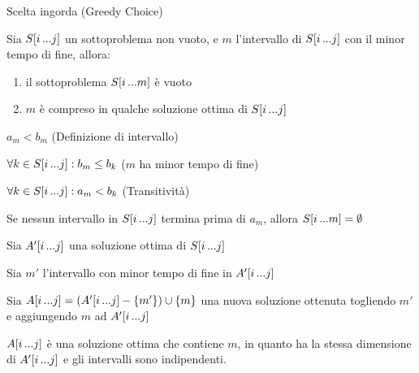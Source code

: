 \begin{frame}{Scelta ingorda (Greedy Choice)}

\vspace{-9pt}
\begin{myboxtitle}[Teorema]
Sia $S[i \mydots j]$ un sottoproblema non vuoto, e $m$ l'intervallo di $S[i \mydots j]$ con il \alert{minor tempo di fine}, allora:
\begin{enumerate}
\item il sottoproblema $S[i \mydots m]$ è vuoto
\item $m$ è compreso in qualche soluzione ottima di $S[i \mydots j]$
\end{enumerate}
\end{myboxtitle}

\vspace{-6pt}
\begin{overprint}
\begin{myboxtitle}

\smallskip
{} \alert{$a_m<b_m$} \hfill (Definizione di intervallo)

\smallskip
{} \alert{$\forall k \in S[i \mydots j]: b_m \leq b_k$} \hfill ($m$ ha minor tempo di fine)

\smallskip
{} \alert{$\forall k \in S[i \mydots j]: a_m < b_k$} \hfill (Transitività)

\bigskip
Se nessun intervallo in $S[i \mydots j]$ termina prima di $a_m$, allora $S[i \mydots m] = \emptyset$
\end{myboxtitle}

\begin{myboxtitle}
\BI
\item Sia \alert{$A'[i \mydots j]$} una soluzione ottima di $S[i \mydots j]$
\item Sia \alert{$m'$} l'intervallo con minor tempo di fine in $A'[i \mydots j]$
\item Sia \alert{$A[i \mydots j] = (A'[i \mydots j] - \{ m' \}) \cup \{ m \}$} una nuova soluzione
ottenuta togliendo $m'$ e aggiungendo $m$ ad $A'[i \mydots j]$
\item \alert{$A[i \mydots j]$ è una soluzione ottima che contiene $m$}, in quanto ha la 
stessa dimensione di $A'[i \mydots j]$ e gli intervalli sono indipendenti.
\EI
\end{myboxtitle}
\end{overprint}

\end{frame}

